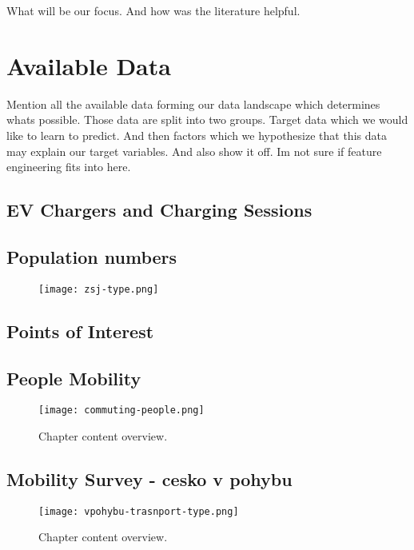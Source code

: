 What will be our focus. And how was the literature helpful.

\chapter{Available Data}
\label{ch:data}



Mention all the available data forming our data landscape which determines whats possible. Those data are split into two groups. Target data which we would like to learn to predict. And then factors which we hypothesize that this data may explain our target variables.
And also show it off. Im not sure if feature engineering fits into here.


\section{EV Chargers and Charging Sessions}


\section{Population numbers}

\begin{figure}[hb]
    \texttt{[image: zsj-type.png]}
\end{figure}

\section{Points of Interest}


\section{People Mobility}

\begin{figure*}[hb]
    \texttt{[image: commuting-people.png]}
    \caption[Problem modelling overview]{Chapter content overview. }
\end{figure*}

\section{Mobility Survey - cesko v pohybu}

\begin{figure*}[hb]
    \texttt{[image: vpohybu-trasnport-type.png]}
    \caption[Problem modelling overview]{Chapter content overview. }
\end{figure*}

